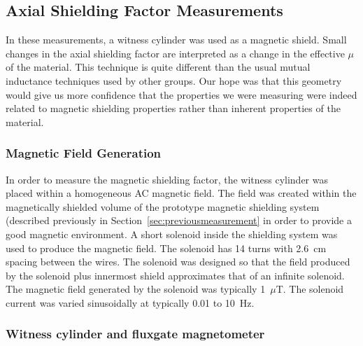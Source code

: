 
\subsection{Axial Shielding Factor Measurements}

In these measurements, a witness cylinder was used as a magnetic
shield.  Small changes in the axial shielding factor are interpreted
as a change in the effective $\mu$ of the material.  This technique is
quite different than the usual mutual inductance techniques used by
other groups.  Our hope was that this geometry would give us more
confidence that the properties we were measuring were indeed related
to magnetic shielding properties rather than inherent properties of
the material.

\subsubsection{Magnetic Field Generation}

In order to measure the magnetic shielding factor, the witness
cylinder was placed within a homogeneous AC magnetic field.  The field
was created within the magnetically shielded volume of the prototype
magnetic shielding system (described previously in
Section~\ref{sec:previousmeasurement} in order to provide a good
magnetic environment.  A short solenoid inside the shielding system
was used to produce the magnetic field.
The solenoid has 14 turns with 2.6~cm spacing between the wires.  The
solenoid was designed so that the field produced by the solenoid plus
innermost shield approximates that of an infinite solenoid.  The
magnetic field generated by the solenoid was typically 1~$\mu$T.  The
solenoid current was varied sinusoidally at typically 0.01 to 10~Hz.



\subsubsection{Witness cylinder and fluxgate magnetometer}


